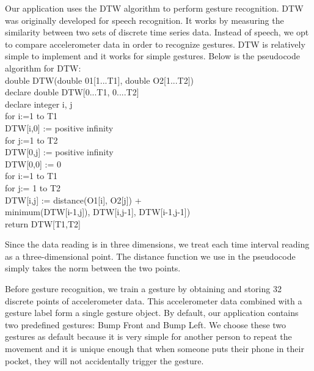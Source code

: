 \documentclass[journal]{IEEEtran}
\begin{document}
Our application uses the DTW algorithm to perform gesture recognition. DTW was originally developed for speech recognition. It works by measuring the similarity between two sets of discrete time series data. Instead of speech, we opt to compare accelerometer data in order to recognize gestures. DTW is relatively simple to implement and it works for simple gestures. Below is the pseudocode algorithm for DTW:\\
\noindent 
	double DTW(double 01[1...T1], double O2[1...T2])\\
 	\hspace*{0.25cm}declare double DTW[0...T1, 0....T2]\\
 	\hspace*{0.25cm}declare integer i, j\\
 	\hspace*{0.25cm}for i:=1 to T1\\
 	\hspace*{0.5cm}DTW[i,0] := positive infinity\\
 	\hspace*{0.25cm}for j:=1 to T2\\
 	\hspace*{0.25cm}DTW[0,j] := positive infinity\\
 	\hspace*{0.25cm}DTW[0,0] := 0\\
 	\hspace*{0.25cm}for i:=1 to T1\\
 	\hspace*{0.5cm}for j:= 1 to T2\\
 	\hspace*{0.75cm}DTW[i,j] := distance(O1[i], O2[j]) +\\
 	\hspace*{1cm}minimum(DTW[i-1,j]), DTW[i,j-1], DTW[i-1,j-1])\\
 	\hspace*{0.25cm}return DTW[T1,T2]

Since the data reading is in three dimensions, we treat each time interval reading as a three-dimensional point. The distance function we use in the pseudocode simply takes the norm between the two points. 

Before gesture recognition, we train a gesture by obtaining and storing 32 discrete points of accelerometer data. This accelerometer data combined with a gesture label form a single gesture object. By default, our application contains two predefined gestures: Bump Front and Bump Left. We choose these two gestures as default because it is very simple for another person to repeat the movement and it is unique enough that when someone puts their phone in their pocket, they will not accidentally trigger the gesture.
\end{document}
